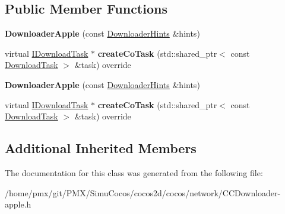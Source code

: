 \subsection*{Public Member Functions}
\begin{DoxyCompactItemize}
\item 
\mbox{\label{classcocos2d_1_1network_1_1DownloaderApple_a0f05677615b19d6ec4506f3dff00f4bb}} 
{\bfseries Downloader\+Apple} (const \hyperlink{classcocos2d_1_1network_1_1DownloaderHints}{Downloader\+Hints} \&hints)
\item 
\mbox{\label{classcocos2d_1_1network_1_1DownloaderApple_ad334e67f1688c89dbba8f3f756383a4c}} 
virtual \hyperlink{classcocos2d_1_1network_1_1IDownloadTask}{I\+Download\+Task} $\ast$ {\bfseries create\+Co\+Task} (std\+::shared\+\_\+ptr$<$ const \hyperlink{classcocos2d_1_1network_1_1DownloadTask}{Download\+Task} $>$ \&task) override
\item 
\mbox{\label{classcocos2d_1_1network_1_1DownloaderApple_a0f05677615b19d6ec4506f3dff00f4bb}} 
{\bfseries Downloader\+Apple} (const \hyperlink{classcocos2d_1_1network_1_1DownloaderHints}{Downloader\+Hints} \&hints)
\item 
\mbox{\label{classcocos2d_1_1network_1_1DownloaderApple_ad334e67f1688c89dbba8f3f756383a4c}} 
virtual \hyperlink{classcocos2d_1_1network_1_1IDownloadTask}{I\+Download\+Task} $\ast$ {\bfseries create\+Co\+Task} (std\+::shared\+\_\+ptr$<$ const \hyperlink{classcocos2d_1_1network_1_1DownloadTask}{Download\+Task} $>$ \&task) override
\end{DoxyCompactItemize}
\subsection*{Additional Inherited Members}


The documentation for this class was generated from the following file\+:\begin{DoxyCompactItemize}
\item 
/home/pmx/git/\+P\+M\+X/\+Simu\+Cocos/cocos2d/cocos/network/C\+C\+Downloader-\/apple.\+h\end{DoxyCompactItemize}
